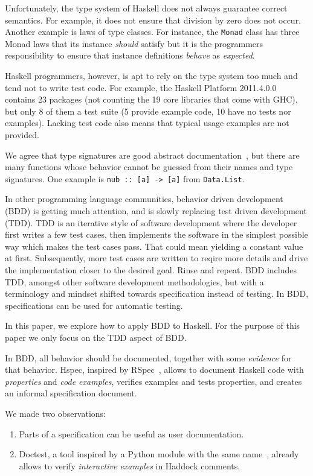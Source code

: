 \documentclass[preprint]{sigplanconf}
\begin{document}
Unfortunately, the type system of Haskell does not always guarantee
correct semantics.
For example, it does not ensure that division by zero does not occur.
Another example is laws of type classes.
For instance, the {\tt Monad} class has three Monad laws
that its instance \emph{should} satisfy
but
it is the programmers responsibility to ensure that
instance definitions \emph{behave} as \emph{expected}.

Haskell programmers, however, is apt to rely on the type system too
much and tend not to write test code.  For example, the Haskell
Platform 2011.4.0.0 contains 23 packages (not counting the 19 core
libraries that come with GHC), but only 8 of them a test suite (5
provide example code, 10 have no tests nor examples).  Lacking test
code also means that typical usage examples are not provided.

We agree that type signatures are good abstract documentation~\cite{free}, but
there are many functions whose behavior cannot be guessed from their names and
type signatures.  One example is \verb|nub :: [a] -> [a]| from {\tt Data.List}.

In other programming language communities, behavior driven development
(BDD) is getting much attention, and is slowly replacing test driven
development (TDD).  TDD is an iterative style of software development
where the developer first writes a few test cases, then implements the
software in the simplest possible way which makes the test cases pass.
That could mean yielding a constant value at first.  Subsequently,
more test cases are written to reqire more details and drive the
implementation closer to the desired goal.  Rinse and repeat.  BDD
includes TDD, amongst other software development methodologies, but
with a terminology and mindset  shifted towards specification instead
of testing.  In BDD, specifications can be used for automatic testing.

In this paper, we explore how to apply BDD to Haskell.
For the purpose of this paper we only focus on the TDD aspect of BDD.

In BDD, all behavior should be documented, together with some
\emph{evidence} for that behavior.  Hspec, inspired by
RSpec~\cite{rspec}, allows to document Haskell code with
\emph{properties} and \emph{code examples}, verifies examples and
tests properties, and creates an informal specification document.

We made two observations:
\begin{enumerate}
    \item
        Parts of a specification can be useful as user documentation.
    \item
        Doctest, a tool inspired by a Python module with the same
        name~\cite{doctest}, already allows to verify
        \emph{interactive examples} in Haddock comments.
\end{enumerate}
\end{document}
